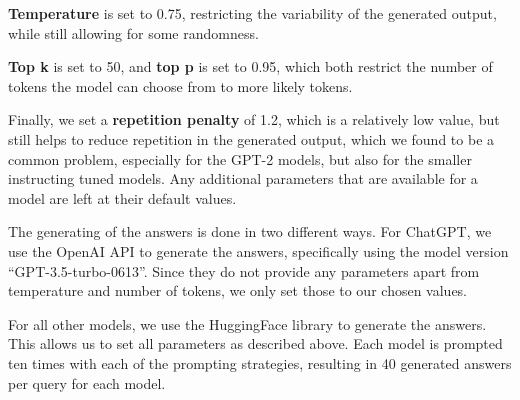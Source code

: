 \textbf{Temperature} is set to 0.75, restricting the variability of the generated output, while still allowing for some randomness.

\textbf{Top k} is set to 50, and \textbf{top p} is set to 0.95, which both restrict the number of tokens the model can choose from to more likely tokens.

Finally, we set a \textbf{repetition penalty} of 1.2, which is a relatively low value, but still helps to reduce repetition in the generated output, which we found to be a common problem, especially for the GPT-2 models, but also for the smaller instructing tuned models.
Any additional parameters that are available for a model are left at their default values.

The generating of the answers is done in two different ways.
For ChatGPT, we use the OpenAI API to generate the answers, specifically using the model version ``GPT-3.5-turbo-0613''.
Since they do not provide any parameters apart from temperature and number of tokens, we only set those to our chosen values.

For all other models, we use the HuggingFace library to generate the answers.
This allows us to set all parameters as described above.
Each model is prompted ten times with each of the prompting strategies, resulting in 40 generated answers per query for each model.